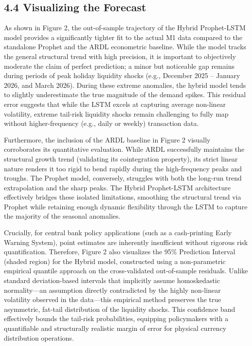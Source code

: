 \documentclass[12pt, letterpaper]{article}
\begin{document}
\subsection*{4.4 Visualizing the Forecast}
As shown in Figure 2, the out-of-sample trajectory of the Hybrid Prophet-LSTM model provides a significantly tighter fit to the actual M1 data compared to the standalone Prophet and the ARDL econometric baseline. While the model tracks the general structural trend with high precision, it is important to objectively moderate the claim of perfect prediction; a minor but noticeable gap remains during periods of peak holiday liquidity shocks (e.g., December 2025 -- January 2026, and March 2026). During these extreme anomalies, the hybrid model tends to slightly underestimate the true magnitude of the demand spikes. This residual error suggests that while the LSTM excels at capturing average non-linear volatility, extreme tail-risk liquidity shocks remain challenging to fully map without higher-frequency (e.g., daily or weekly) transaction data.

Furthermore, the inclusion of the ARDL baseline in Figure 2 visually corroborates its quantitative evaluation. While ARDL successfully maintains the structural growth trend (validating its cointegration property), its strict linear nature renders it too rigid to bend rapidly during the high-frequency peaks and troughs. The Prophet model, conversely, struggles with both the long-run trend extrapolation and the sharp peaks. The Hybrid Prophet-LSTM architecture effectively bridges these isolated limitations, smoothing the structural trend via Prophet while retaining enough dynamic flexibility through the LSTM to capture the majority of the seasonal anomalies.

Crucially, for central bank policy applications (such as a cash-printing Early Warning System), point estimates are inherently insufficient without rigorous risk quantification. Therefore, Figure 2 also visualizes the 95\% Prediction Interval (shaded region) for the Hybrid model, constructed using a non-parametric empirical quantile approach on the cross-validated out-of-sample residuals. Unlike standard deviation-based intervals that implicitly assume homoskedastic normality---an assumption directly contradicted by the highly non-linear volatility observed in the data---this empirical method preserves the true asymmetric, fat-tail distribution of the liquidity shocks. This confidence band effectively bounds the tail-risk probabilities, equipping policymakers with a quantifiable and structurally realistic margin of error for physical currency distribution operations.
\end{document}
